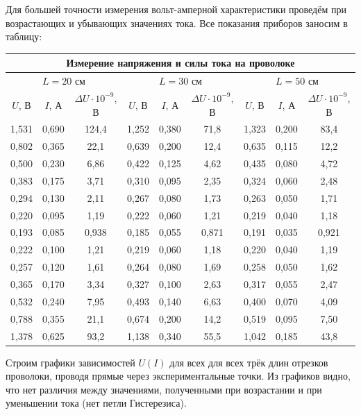 \documentclass[a4paper, 12pt]{article} %
\begin{document}
Для большей точности измерения вольт-амперной характеристики проведём при возрастающих и убывающих значениях тока. Все показания приборов заносим в таблицу:
\begin{center}
\begin{tabular}{|c|c|c|c|c|c|c|c|c|}
\hline
\multicolumn{9}{|c|}{Измерение напряжения и силы тока на проволоке}                                                                                \\ \hline
\multicolumn{3}{|c|}{$L = 20$ см} & \multicolumn{3}{c|}{$L = 30$ см} & \multicolumn{3}{c|}{$L = 50$ см}                         \\ \hline
$U$, В & $I$, А & $\Delta U \cdot 10^{-9}$, В & $U$, В & $I$, А & $\Delta U \cdot 10^{-9}$, В & $U$, В & $I$, А & $\Delta U \cdot 10^{-9}$, В \\ \hline
1,531&0,690&124,4&1,252&0,380&71,8  &1,323&0,200&83,4  \\ \hline  
0,802&0,365& 22,1&0,639&0,200&12,4  &0,635&0,115&12,2  \\ \hline
0,500&0,230& 6,86&0,422&0,125&4,62  &0,435&0,080&4,72  \\ \hline
0,383&0,175& 3,71&0,310&0,095&2,35  &0,324&0,060&2,48  \\ \hline
0,294&0,130& 2,11&0,267&0,080&1,73  &0,263&0,050&1,71  \\ \hline
0,220&0,095& 1,19&0,222&0,060&1,21  &0,219&0,040&1,18  \\ \hline
0,193&0,085&0,938&0,185&0,055&0,871 &0,191&0,035&0,921  \\ \hline
0,222&0,100& 1,21&0,219&0,060&1,18  &0,220&0,040&1,19  \\ \hline
0,257&0,120& 1,61&0,264&0,080&1,69  &0,258&0,050&1,62  \\ \hline
0,365&0,170& 3,34&0,327&0,100&2,63  &0,317&0,055&2,47  \\ \hline
0,532&0,240& 7,95&0,493&0,140&6,63  &0,400&0,070&4,09  \\ \hline
0,788&0,355& 21,1&0,674&0,200&14,2  &0,519&0,095&7,50  \\ \hline
1,378&0,625& 93,2&1,138&0,340&55,5  &1,042&0,185&43,8  \\ \hline
\end{tabular}
\end{center}

Строим графики зависимостей $U(I)$ для всех для всех трёк длин отрезков проволоки, проводя прямые через экспериментальные точки. Из графиков видно, что нет различия между значениями, полученными при возрастании и при уменьшении тока (нет петли Гистерезиса).
\end{document}

